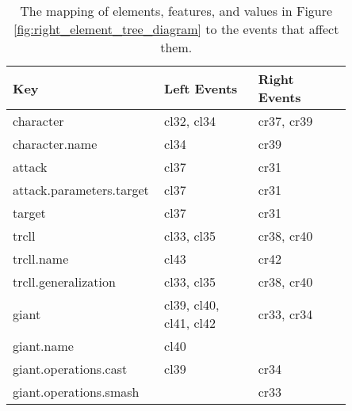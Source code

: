 \begin{table*}[ht]
\centering
\caption{The mapping of elements, features, and values in Figure \ref{fig:right_element_tree_diagram} to the events that affect them.}
\label{tab:keyeventsmap}
  \begin{scriptsize}
\begin{sffamily}
\begin{tabular}{|m{0.30\linewidth}|m{0.275\linewidth}|m{0.275\linewidth}|}
\hline
\textbf{Key} & \textbf{Left Events} & \textbf{Right Events} \\ \hline
character                          & cl32, cl34                                & cr37, cr39                                 \\ \hline
character.name                     & cl34                                      & cr39                                       \\ \hline
attack                             & cl37                                      & cr31                                       \\ \hline
attack.parameters.target           & cl37                                      & cr31                                       \\ \hline
target                             & cl37                                      & cr31                                       \\ \hline
trcll                              & cl33, cl35                                & cr38, cr40                                 \\ \hline
trcll.name                         & cl43                                      & cr42                                       \\ \hline
trcll.generalization               & cl33, cl35                                & cr38, cr40                                 \\ \hline
giant                              & cl39, cl40, cl41, cl42                    & cr33, cr34                                 \\ \hline
giant.name                         & cl40                                      &                                            \\ \hline
giant.operations.cast              & cl39                                      & cr34                                       \\ \hline
giant.operations.smash             &                                           & cr33                                       \\ \hline

\end{tabular}
\end{sffamily}
\end{scriptsize}
\end{table*}
